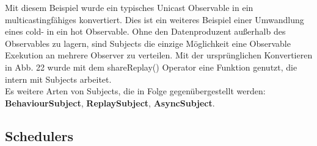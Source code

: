 \noindent
Mit diesem Beispiel wurde ein typisches Unicast Observable in ein multicastingfähiges konvertiert. Dies ist ein weiteres Beispiel einer Umwandlung eines cold- in ein hot Observable. Ohne den Datenproduzent außerhalb des Observables zu lagern, sind Subjects die einzige Möglichkeit eine Observable Exekution an mehrere Observer zu verteilen. Mit der ursprünglichen Konvertieren in Abb. 22 wurde mit dem shareReplay() Operator eine Funktion genutzt, die intern mit Subjects arbeitet.\\

\noindent
Es weitere Arten von Subjects, die in Folge gegenübergestellt werden: \textbf{BehaviourSubject}, \textbf{ReplaySubject}, \textbf{AsyncSubject}.

\subsection{Schedulers}

